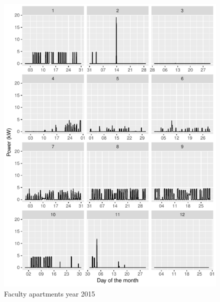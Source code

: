\documentclass[11pt, oneside]{article}   	%
\begin{document}
\begin{figure}
\includegraphics[keepaspectratio]{fac_build_Y2015.pdf}
\caption{Faculty apartments  year 2015 }
\end{figure}
\end{document}
